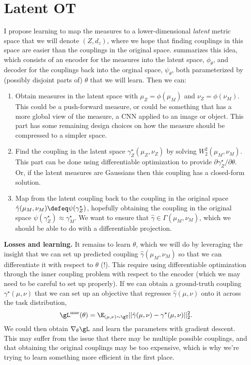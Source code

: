 \section{Latent OT}
\label{sec:latent-ot}
I propose learning to map the measures to a lower-dimensional
\emph{latent} metric space that we will denote $(Z,d_z)$, where
we hope that finding couplings in this space are easier than
the couplings in the original space.
 summarizes this idea, which consists of
an encoder for the measures into the latent
space, $\phi_\theta$, and decoder for the couplings back into the
orginal space, $\psi_\theta$, both parameterized by
(possibly disjoint parts of) $\theta$ that we will learn.
Then we can:
\begin{enumerate}
\item Obtain measures in the latent space with
  $\mu_Z = \phi(\mu_M)$ and $\nu_Z = \phi(\nu_M)$.
  This could be a push-forward measure, or could
  be something that has a more global view of the
  measure, \eg a CNN applied to an image or object.
  This part has some remaining design choices on
  how the measure should be compressed to a
  simpler space.
\item Find the coupling in the latent space $\gamma_Z^\star(\mu_Z, \nu_Z)$
  by solving $W_2^2(\mu_M, \nu_M)$. This part
  can be done using differentiable optimization
  \citep{amos2019differentiable} to provide
  $\partial \gamma_Z^\star / \partial \theta$.
  Or, if the latent measures are Gaussians then
  this coupling has a closed-form solution.
\item Map from the latent coupling back to the coupling
  in the original space
  $\hat\gamma(\mu_M, \nu_M)\defeq \psi(\gamma_Z^\star)$,
  hopefully obtaining the
  coupling in the original space
  $\psi(\gamma_Z^\star) \approx \gamma_M^\star$.
  We want to ensure that
  $\hat\gamma\in\Gamma(\mu_M,\nu_M)$, which we should
  be able to do with a differentiable projection.
\end{enumerate}



\textbf{Losses and learning.}
It remains to learn $\theta$, which we will do by leveraging the
insight that we can set up predicted coupling $\hat\gamma(\mu_M, \nu_M)$
so that we can differentiate it with respect to $\theta$ (!).
This require using differentiable optimization \citep{amos2019differentiable}
through the inner coupling problem with respect to the encoder
(which we may need to be careful to set up properly).
If we can obtain a ground-truth coupling $\gamma^\star(\mu,\nu)$ that we can
set up an objective that regresses $\hat\gamma(\mu,\nu)$ onto it
across the task distribution, \ie
\begin{equation}
  \gL^{\rm mse}(\theta) = \E_{(\mu,\nu)\sim\gT} ||\hat\gamma(\mu, \nu) - \gamma^\star(\mu, \nu)||_2^2.
\end{equation}
We could then obtain $\nabla_\theta \gL$ and learn the parameters with gradient descent.
This may suffer from the issue that there may be multiple possible
couplings, and that obtaining the original couplings may be too expensive,
which is why we're trying to learn something more efficient in the first place.

